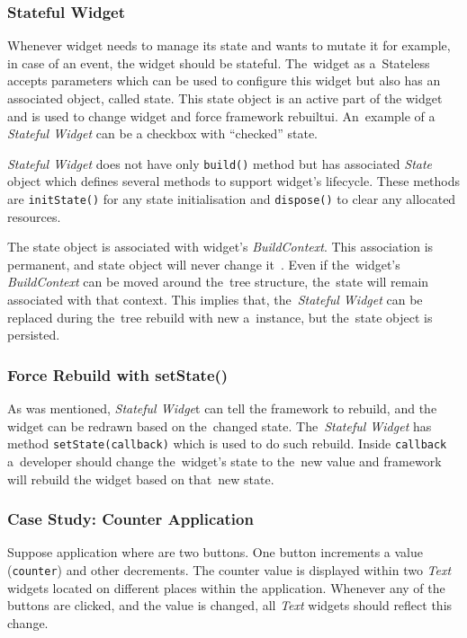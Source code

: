 \subsubsection{Stateful Widget}
Whenever widget needs to manage its state and wants to mutate it for example, in case of an event, the widget should be stateful. The~widget as a~Stateless accepts parameters which can be used to configure this widget but also has an associated object, called state. This state object is an active part of the widget and is used to change widget and force framework rebuilt\gls{ui}. An~example of a \textit{Stateful Widget} can be a checkbox with ``checked'' state. 

\textit{Stateful Widget} does not have only \verb|build()| method but has associated \textit{State} object which defines several methods to support widget's lifecycle. These methods are \verb|initState()| for any state initialisation and \verb|dispose()| to clear any allocated resources. 

The state object is associated with widget's \textit{BuildContext}. This association is permanent, and state object will never change it~\cite{notion-widget-didier}. Even if the~widget's \textit{BuildContext} can be moved around the~tree structure, the~state will remain associated with that context. This implies that, the~\textit{Stateful Widget} can be replaced during the~tree rebuild with new a~instance, but the~state object is persisted. 
\subsubsection{Force Rebuild with setState()}
As was mentioned, \textit{Stateful Widge}t can tell the framework to rebuild, and the widget can be redrawn based on the~changed state. The~\textit{Stateful Widget} has method \verb|setState(callback)| which is used to do such rebuild. Inside \verb|callback| a~developer should change the~widget's state to the~new value and framework will rebuild the widget based on that~new state. 
\subsubsection{Case Study: Counter Application}
Suppose application where are two buttons. One button increments a value (\verb|counter|) and other decrements. The counter value is displayed within two \textit{Text} widgets located on different places within the application. Whenever any of the buttons are clicked, and the value is changed, all \textit{Text} widgets should reflect this change.

